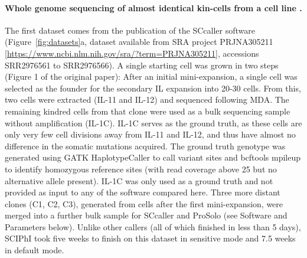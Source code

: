 \documentclass[12pt,inline]{wlscirep}
\begin{document}
\paragraph{Whole genome sequencing of almost identical kin-cells from a cell line \cite{dong_accurate_2017}.}
The first dataset comes from the publication of the SCcaller software\cite{dong_accurate_2017} (Figure~\ref{fig:datasets}a, dataset available from SRA project \mbox{PRJNA305211} [\url{https://www.ncbi.nlm.nih.gov/sra/?term=PRJNA305211}], accessions \mbox{SRR2976561} to \mbox{SRR2976566}).
A single starting cell was grown in two steps (Figure 1 of the original paper\cite{dong_accurate_2017}):
After an initial mini-expansion, a single cell was selected as the founder for the secondary IL expansion into 20-30 cells.
From this, two cells were extracted (IL-11 and IL-12) and sequenced following MDA.
The remaining kindred cells from that clone were used as a bulk sequencing sample without amplification (IL-1C).
IL-1C serves as the ground truth, as these cells are only very few cell divisions away from IL-11 and IL-12, and thus have almost no difference in the somatic mutations acquired.
The ground truth genotype was generated using GATK HaplotypeCaller to call variant sites and bcftools mpileup to identify homozygous reference sites (with read coverage above 25 but no alternative allele present).
IL-1C was only used as a ground truth and not provided as input to any of the software compared here.
Three more distant clones (C1, C2, C3), generated from cells after the first mini-expansion, were merged into a further bulk sample for SCcaller and ProSolo (see Software and Parameters below).
Unlike other callers (all of which finished in less than 5 days), SCIPhI took five weeks to finish on this dataset in sensitive mode and 7.5 weeks in default mode.\\
\end{document}
